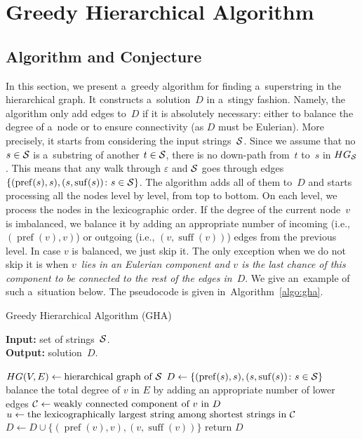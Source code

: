 \documentclass[11pt,letterpaper]{article}
\DeclareMathOperator{\pref}{pref}
\DeclareMathOperator{\suff}{suff}
\begin{document}
\section{Greedy Hierarchical Algorithm}
\subsection{Algorithm and Conjecture}
In this section, we present a~greedy algorithm for
finding a~superstring in the hierarchical graph. 
It constructs a~solution~$D$ in a~stingy fashion. 
Namely, the algorithm only add edges to~$D$ 
if it is absolutely necessary: either to balance the degree of a~node or to ensure connectivity 
(as $D$ must be Eulerian). 
More precisely, it starts from considering the input
strings~${\cal S}$. Since we assume that 
no $s \in {\cal S}$ is a~substring of another 
$t \in {\cal S}$, there is no down-path from~$t$ to~$s$ in $HG_{\cal S}$. 
This means that any walk through $\varepsilon$ and ${\cal S}$ goes through edges $\{(\operatorname{pref}(s), s), (s, \operatorname{suf}(s)) \colon s \in {\cal S}\}$. The algorithm adds all of them to~$D$ and starts processing all the nodes level by level, from top to bottom. On each level, we process the nodes in the lexicographic order. If the degree of the current node~$v$ is imbalanced, we balance it by adding an appropriate number of incoming (i.e., $(\pref(v),v)$) or outgoing (i.e., $(v, \suff(v))$) edges from the previous level. In case $v$ is balanced, we just skip it. The only exception when we do not skip it is when {\em $v$~lies in an Eulerian component and $v$ is the last chance of this component to be connected to the rest of the edges in~$D$}. We give an~example of such a~situation below. The pseudocode is given in~Algorithm~\ref{algo:gha}.


\begin{algorithm}
\label{algo:gha}
\caption{Greedy Hierarchical Algorithm (GHA)}
\hspace*{\algorithmicindent} \textbf{Input:} set of strings~${\cal S}$.\\
\hspace*{\algorithmicindent} \textbf{Output:} solution~$D$.
\begin{algorithmic}[1]
\State $HG(V,E) \gets \text{hierarchical graph of ${\cal S}$}$ 
\State $D \gets \{(\operatorname{pref}(s), s), (s, \operatorname{suf}(s)) \colon s \in {\cal S}\}$
\State balance the total degree of $v$ in $E$ by adding an appropriate number of lower edges
\Else
\State ${\cal C} \gets \text{weakly connected component of $v$ in $D$}$
\State $u \gets \text{the lexicographically largest string among shortest strings in ${\cal C}$}$
\State $D \gets D \cup \{(\pref(v), v), (v, \suff(v))\}$
\EndIf
\EndIf
\EndFor
\EndFor
\State return $D$
\end{algorithmic}
\end{algorithm}
\end{document}
